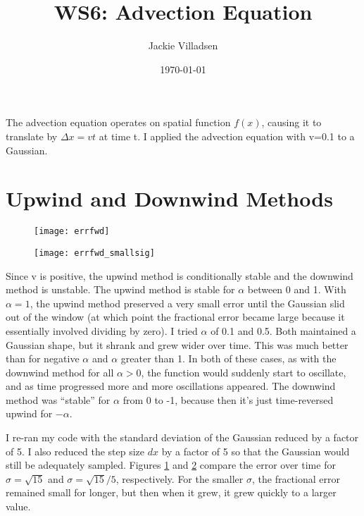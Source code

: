 \documentclass{article}
\begin{document}
\title{WS6: Advection Equation}
\author{Jackie Villadsen}
\date{\today}
\maketitle


The advection equation operates on spatial function $f(x)$, causing it to translate by ${\Delta}x=vt$ at time
t.  I applied the advection equation with v=0.1 to a Gaussian.

\section{Upwind and Downwind Methods}
\begin{figure}[h]
  \begin{center}
     \texttt{[image: errfwd]}
  \end{center}
  \label{fig:errfwd}
\end{figure}

\begin{figure}[h]
  \begin{center}
     \texttt{[image: errfwd\_smallsig]}
  \end{center}
  \label{fig:errfwd_smallsig}
\end{figure}

Since v is positive, the upwind method is conditionally stable and the downwind method is
unstable.  The upwind method is stable for $\alpha$ between 0 and 1.  With $\alpha=1$, the upwind method
preserved a very small error until the Gaussian slid out of the window (at which point the fractional error
became large because it essentially involved dividing by zero).  I tried $\alpha$ of 0.1 and 0.5.  Both maintained
a Gaussian shape, but it shrank and grew wider over time.  This was much better than for negative $\alpha$ and
$\alpha$ greater than 1.  In both of these cases, as with the downwind method for all $\alpha>0$, the function
would suddenly start to oscillate, and as time progressed more and more oscillations appeared.  The downwind method
was ``stable'' for $\alpha$ from 0 to -1, because then it's just time-reversed upwind for $-\alpha$.

I re-ran my code with the standard deviation of the Gaussian reduced by a factor of 5.  I also reduced the step
size $dx$ by a factor of 5 so that the Gaussian would still be adequately sampled.  Figures \ref{fig:errfwd}
and \ref{fig:errfwd_smallsig} compare the error over time for $\sigma=\sqrt{15}$ and $\sigma=\sqrt{15}/5$, respectively.
For the smaller $\sigma$, the fractional error remained small for longer, but then when it grew, it grew quickly to
a larger value.
\end{document}
